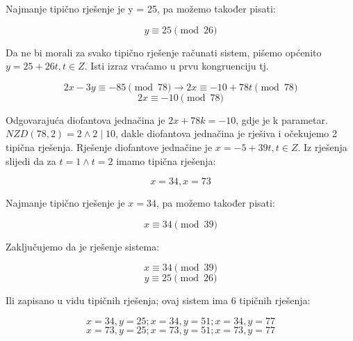 \documentclass[12pt]{article}
\begin{document}
Najmanje tipično rješenje je y = 25, pa možemo također pisati:

$$y \equiv 25 \pmod{26}$$ \vspace{1mm}

Da ne bi morali za svako tipično rješenje računati sistem, pišemo općenito $y = 25 + 26t, t \in Z$. Isti izraz vraćamo u prvu kongruenciju tj.

$$2x - 3y \equiv -85 \pmod{78} \to 2x \equiv -10 + 78t \pmod{78}$$
$$2x \equiv -10 \pmod{78}$$\vspace{1mm}

Odgovarajuća diofantova jednačina je $2x + 78k = -10$, gdje je k parametar. $NZD(78, 2) = 2 \land 2 \mid 10$, dakle diofantova jednačina je rješiva i očekujemo 2 tipična rješenja. Rješenje diofantove jednačine je $x = -5 + 39t, t \in Z$. Iz rješenja slijedi da za $t = 1 \land t = 2$ imamo tipična rješenja:

$$x = 34, x = 73$$\vspace{1mm}

Najmanje tipično rješenje je $x = 34$, pa možemo također pisati:

$$x \equiv 34 \pmod{39}$$\vspace{1mm}

Zaključujemo da je rješenje sistema:

$$x \equiv 34 \pmod{39}$$
$$y \equiv 25 \pmod{26}$$\vspace{1mm}

Ili zapisano u vidu tipičnih rješenja; ovaj sistem ima 6 tipičnih rješenja:

$$x = 34, y = 25; x = 34, y = 51; x = 34, y = 77$$
$$x = 73, y = 25; x = 73, y = 51; x = 73, y = 77$$
\end{document}

